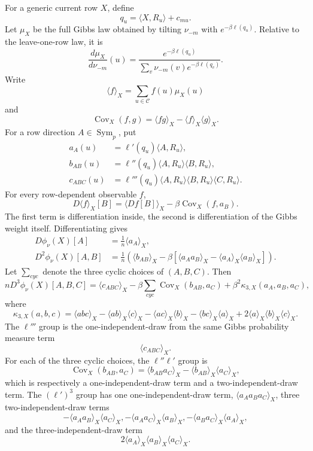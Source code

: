 \documentclass[11pt]{article}
\numberwithin{equation}{section}
\theoremstyle{definition}
\theoremstyle{remark}
\newcommand{\1}{\boldsymbol 1}
\begin{document}
\begin{aiblock}
For a generic current row $X$, define
\[
    q_u = \langle X, R_u \rangle + c_{mu}.
\]
Let $\mu_X$ be the full Gibbs law obtained by tilting $\nu_{-m}$ with $e^{-\beta\ell(q_u)}$. Relative to the leave-one-row law, it is
\[
    \frac{d\mu_X}{d\nu_{-m}}(u) = \frac{e^{-\beta \ell(q_u)}}{\sum_v \nu_{-m}(v) e^{-\beta \ell(q_v)}}.
\]
Write
\[
    \langle f \rangle_X = \sum_{u \in \mathcal C} f(u) \mu_X(u)
\]
and
\[
    \operatorname{Cov}_X(f, g) = \langle f g \rangle_X - \langle f \rangle_X \langle g \rangle_X.
\]
For a row direction $A \in \operatorname{Sym}_p$, put
\begin{align*}
    a_A(u) &= \ell'(q_u) \langle A, R_u \rangle, \\
    b_{AB}(u) &= \ell''(q_u) \langle A, R_u \rangle \langle B, R_u \rangle, \\
    c_{ABC}(u) &= \ell'''(q_u) \langle A, R_u \rangle \langle B, R_u \rangle \langle C, R_u \rangle.
\end{align*}
For every row-dependent observable $f$,
\[
    D\langle f\rangle_X[B] = \langle D f[B] \rangle_X - \beta\operatorname{Cov}_X(f, a_B).
\]
The first term is differentiation inside, the second is differentiation of the Gibbs weight itself.
Differentiating gives
\begin{align*}
  D\phi_\nu(X)[A] &= \frac{1}{n} \langle a_A \rangle_X, \\
  D^2\phi_\nu(X)[A,B] &= \frac{1}{n} \left( \langle b_{AB} \rangle_X - \beta[\langle a_A a_B \rangle_X - \langle a_A \rangle_X \langle a_B \rangle_X] \right).
\end{align*}
Let $\sum_{cyc}$ denote the three cyclic choices of $(A, B, C)$. Then
\[
  n D^3\phi_\nu(X)[A, B, C] = \langle c_{ABC} \rangle_X - \beta\sum_{cyc} \operatorname{Cov}_X(b_{A B}, a_C) + \beta^2\kappa_{3, X}(a_A, a_B, a_C),
\]
where
\[
    \kappa_{3,X}(a, b, c)
        = \langle abc \rangle_X
        - \langle ab \rangle_X \langle c \rangle_X
        - \langle ac \rangle_X \langle b \rangle_X
        - \langle bc \rangle_X \langle a \rangle_X
        + 2 \langle a \rangle_X \langle b \rangle_X \langle c \rangle_X.
\]
The $\ell'''$ group is the one-independent-draw from the same Gibbs probability measure term
\[
    \langle c_{ABC}\rangle_X.
\]
For each of the three cyclic choices, the $\ell'' \ell'$ group is
\[
  \operatorname{Cov}_X(b_{A B}, a_C) = \langle b_{A B} a_C \rangle_X -\langle b_{A B} \rangle_X \langle a_C \rangle_X,
\]
which is respectively a one-independent-draw term and a two-independent-draw term.
The $(\ell')^3$ group has one one-independent-draw term, $\langle a_A a_B a_C\rangle_X$, three two-independent-draw terms
\[
    -\langle a_A a_B \rangle_X \langle a_C \rangle_X,
    -\langle a_A a_C \rangle_X \langle a_B \rangle_X,
    -\langle a_B a_C \rangle_X \langle a_A \rangle_X,
\]
and the three-independent-draw term
\[
    2 \langle a_A \rangle_X \langle a_B \rangle_X \langle a_C \rangle_X.
\]



\end{aiblock}
\end{document}
